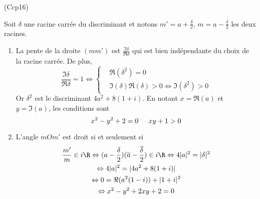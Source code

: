 \begin{tiny}(Ccp16)\end{tiny} \label{Ccp16}
Soit $\delta$ une racine carrée du discriminant et notons $m'= a +\frac{\delta}{2}$, $m= a -\frac{\delta}{2}$ les deux racines.
\begin{enumerate}
  \item La pente de la droite $(mm')$ est $\frac{\Im \delta}{\Re \delta}$ qui est bien indépendante du choix de la racine carrée.
De plus,
\begin{displaymath}
  \frac{\Im \delta}{\Re \delta} = 1 \Leftrightarrow 
\left\lbrace  
\begin{aligned}
  &\Re(\delta ^2) = 0 \\ &\Im(\delta)\Re(\delta)>0
  \Leftrightarrow \Im(\delta^2) > 0
\end{aligned}
\right. 
\end{displaymath}
Or $\delta^2$ est le discriminant $4a^2+8(1+i)$. En notant $x=\Re(a)$ et $y=\Im(a)$, les conditions sont
\begin{displaymath}
  x^2 - y^2 + 2 = 0 \hspace{0.5cm} xy + 1 > 0
\end{displaymath}

\item L'angle $mOm'$ est droit si et seulement si
\begin{multline*}
  \frac{m'}{m}\in i\R \Leftrightarrow (a-\frac{\delta}{2})(\overline{a}-\frac{\overline{\delta}}{2}) \in i\R
  \Leftrightarrow 4|a|^2 = |\delta|^2\\
  \Leftrightarrow 4|a|^2 = |4a^2+8(1+i)|\\
  \Leftrightarrow 0 = \Re(a^2(1-i)) + |1+i|^2\\
  \Leftrightarrow x^2 - y^2 +2xy +2 = 0
\end{multline*}

\end{enumerate}


